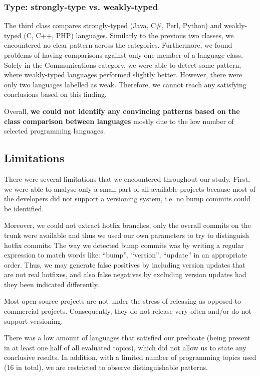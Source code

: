 \documentclass{sig-alternate}
\begin{document}
\subsubsection*{Type: strongly-type vs. weakly-typed}
The third class compares strongly-typed (Java, C\#, Perl, Python) and weakly-typed (C, C++, PHP) languages. Similarly to the previous two classes, we encountered no clear pattern across the categories. Furthermore, we found problems of having comparisons against only one member of a language class. Solely in the Communications category, we were able to detect some pattern, where weakly-typed languages performed slightly better. However, there were only two languages labelled as weak. Therefore, we cannot reach any satisfying conclusions based on this finding.

Overall, \textbf{we could not identify any convincing patterns based on the class comparison between languages} mostly due to the low number of selected programming languages.

\subsection{Limitations}
There were several limitations that we encountered throughout our study. First, we were able to analyse only a small part of all available projects because most of the developers did not support a versioning system, i.e. no bump commits could be identified.

Moreover, we could not extract hotfix branches, only the overall commits on the trunk were available and thus we used our own parameters to try to distinguish hotfix commits. The way we detected bump commits was by writing a regular expression to match words like:  ``bump'', ``version'', ``update'' in an appropriate order. Thus, we may generate false positives by including version updates that are not real hotfixes, and also false negatives by excluding version updates had they been indicated differently.

Most open source projects are not under the stress of releasing as opposed to commercial projects. Consequently, they do not release very often and/or do not support versioning.

There was a low amount of languages that satisfied our predicate (being present in at least one half of all evaluated topics), which did not allow us to state any conclusive results. In addition, with a limited number of programming topics used (16 in total), we are restricted to observe distinguishable patterns.
\end{document}
